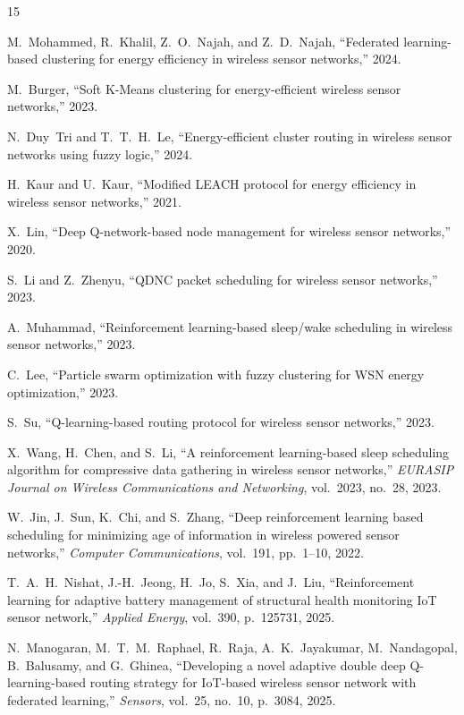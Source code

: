 \documentclass[journal]{IEEEtran}
\begin{document}
\begin{thebibliography}{15}


M.~Mohammed, R.~Khalil, Z.~O.~Najah, and Z.~D.~Najah,
``Federated learning-based clustering for energy efficiency in wireless
sensor networks,''
2024.

M.~Burger,
``Soft K-Means clustering for energy-efficient wireless sensor
networks,''
2023.

N.~Duy~Tri and T.~T.~H.~Le,
``Energy-efficient cluster routing in wireless sensor networks using
fuzzy logic,''
2024.

H.~Kaur and U.~Kaur,
``Modified LEACH protocol for energy efficiency in wireless sensor
networks,''
2021.

X.~Lin,
``Deep Q-network-based node management for wireless sensor networks,''
2020.

S.~Li and Z.~Zhenyu,
``QDNC packet scheduling for wireless sensor networks,''
2023.

A.~Muhammad,
``Reinforcement learning-based sleep/wake scheduling in wireless sensor
networks,''
2023.

C.~Lee,
``Particle swarm optimization with fuzzy clustering for WSN energy
optimization,''
2023.

S.~Su,
``Q-learning-based routing protocol for wireless sensor networks,''
2023.

X.~Wang, H.~Chen, and S.~Li,
``A reinforcement learning-based sleep scheduling algorithm for
compressive data gathering in wireless sensor networks,''
\emph{EURASIP Journal on Wireless Communications and Networking},
vol.~2023, no.~28, 2023.

W.~Jin, J.~Sun, K.~Chi, and S.~Zhang,
``Deep reinforcement learning based scheduling for minimizing age of
information in wireless powered sensor networks,''
\emph{Computer Communications}, vol.~191, pp.~1--10, 2022.

T.~A.~H.~Nishat, J.-H.~Jeong, H.~Jo, S.~Xia, and J.~Liu,
``Reinforcement learning for adaptive battery management of structural
health monitoring IoT sensor network,''
\emph{Applied Energy}, vol.~390, p.~125731, 2025.

N.~Manogaran, M.~T.~M.~Raphael, R.~Raja, A.~K.~Jayakumar,
M.~Nandagopal, B.~Balusamy, and G.~Ghinea,
``Developing a novel adaptive double deep Q-learning-based routing
strategy for IoT-based wireless sensor network with federated
learning,''
\emph{Sensors}, vol.~25, no.~10, p.~3084, 2025.


\end{thebibliography}
\end{document}
